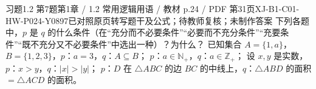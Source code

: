 \par\noindent\begin{minipage}{\linewidth}
\begin{bankitem}{习题1.2 第7题}{第1章 / 1.2 常用逻辑用语 / 教材 p.24 / PDF 第31页}{XJ-B1-C01-HW-P024-Y0897}{已对照原页转写题干及公式；待教师复核；未制作答案}
下列各题中，$p$ 是 $q$ 的什么条件（在“充分而不必要条件”“必要而不充分条件”“充要条件”“既不充分又不必要条件”中选出一种）？为什么？
已知集合 $A=\{1,a\}$，$B=\{1,2,3\}$，$p$：$a=3$，$q$：$A\subseteq B$；
$p$：$a\in\mathbb N_+$，$q$：$a\in\mathbb Z_+$；
设 $x,y$ 是实数，$p$：$x>y$，$q$：$|x|>|y|$；
$p$：$D$ 在 $\triangle ABC$ 的边 $BC$ 的中线上，$q$：$\triangle ABD$ 的面积 $=\triangle ACD$ 的面积。
\end{bankitem}
\end{minipage}\par\medskip
